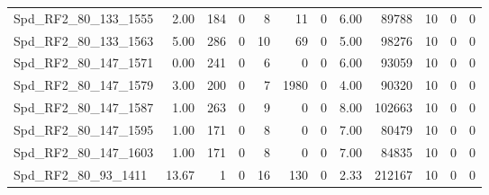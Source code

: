 \begin{longtable}[c]{@{}lrrrrrrrrrrr@{}}
Spd\_RF2\_80\_133\_1555      & 2.00                   & 184                     & 0                       & 8                      & 11                      & 0                       & 6.00                    & 89788                    & 10                       & 0                        & 0                        \\
Spd\_RF2\_80\_133\_1563      & 5.00                   & 286                     & 0                       & 10                     & 69                      & 0                       & 5.00                    & 98276                    & 10                       & 0                        & 0                        \\
Spd\_RF2\_80\_147\_1571      & 0.00                   & 241                     & 0                       & 6                      & 0                       & 0                       & 6.00                    & 93059                    & 10                       & 0                        & 0                        \\
Spd\_RF2\_80\_147\_1579      & 3.00                   & 200                     & 0                       & 7                      & 1980                    & 0                       & 4.00                    & 90320                    & 10                       & 0                        & 0                        \\
Spd\_RF2\_80\_147\_1587      & 1.00                   & 263                     & 0                       & 9                      & 0                       & 0                       & 8.00                    & 102663                   & 10                       & 0                        & 0                        \\
Spd\_RF2\_80\_147\_1595      & 1.00                   & 171                     & 0                       & 8                      & 0                       & 0                       & 7.00                    & 80479                    & 10                       & 0                        & 0                        \\
Spd\_RF2\_80\_147\_1603      & 1.00                   & 171                     & 0                       & 8                      & 0                       & 0                       & 7.00                    & 84835                    & 10                       & 0                        & 0                        \\
Spd\_RF2\_80\_93\_1411       & 13.67                  & 1                       & 0                       & 16                     & 130                     & 0                       & 2.33                    & 212167                   & 10                       & 0                        & 0                        \\

\end{longtable}
